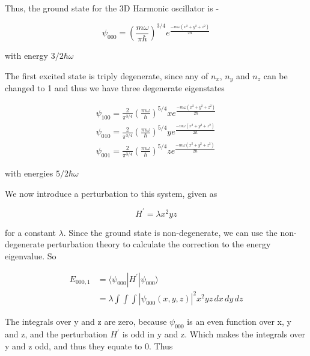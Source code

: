     Thus, the ground state for the 3D Harmonic oscillator is - 

    \begin{equation*}
        \psi_{000} = \left( \frac{m\omega}{\pi\hbar} \right)^{3/4} e^{\frac{-m\omega (x^2 + y^2 + z^2)}{2\hbar}}
    \end{equation*}

    with energy $3/2 \hbar\omega$

    The first excited state is triply degenerate, since any of $n_x$, $n_y$ and $n_z$ can be changed to 1 and thus we have three degenerate eigenstates

    \begin{gather*}
        \psi_{100} = \frac{2}{\pi^{3/4}} \left( \frac{m\omega}{\hbar} \right)^{5/4} x e^{\frac{-m\omega (x^2 + y^2 + z^2)}{2\hbar}} \\
        \psi_{010} = \frac{2}{\pi^{3/4}} \left( \frac{m\omega}{\hbar} \right)^{5/4} y e^{\frac{-m\omega (x^2 + y^2 + z^2)}{2\hbar}} \\
        \psi_{001} = \frac{2}{\pi^{3/4}} \left( \frac{m\omega}{\hbar} \right)^{5/4} z e^{\frac{-m\omega (x^2 + y^2 + z^2)}{2\hbar}} 
    \end{gather*}

    with energies $5/2 \hbar\omega$

    We now introduce a perturbation to this system, given as

    \begin{equation*}
        H^{'} = \lambda x^2yz
    \end{equation*}

    for a constant $\lambda$. Since the ground state is non-degenerate, we can use the non-degenerate perturbation theory to calculate the correction to the energy eigenvalue. So

    \begin{equation*}
        \begin{split}
            E_{000,1} & = \langle \psi_{000} | H^{'} | \psi_{000} \rangle \\
            & = \lambda \int \int \int |\psi_{000}(x,y,z)|^2 x^2yz \, dx \, dy \, dz
        \end{split}
    \end{equation*}

    The integrals over y and z are zero, because $\psi_{000}$ is an even function over x, y and z, and the perturbation $H^{'}$ is odd in y and z. Which makes the integrals over y and z odd, and thus they equate to 0. Thus

